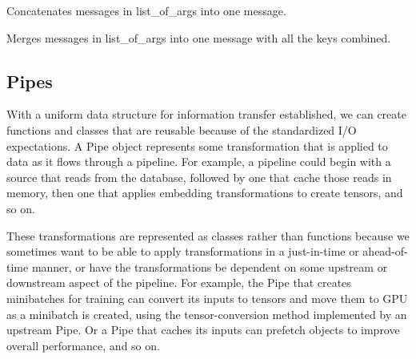 \documentclass[letterpaper,10pt,english]{sphinxmanual}
\begin{document}
\begin{fulllineitems}
\label{\detokenize{Fireworks:Fireworks.core.message.cat}}
Concatenates messages in list\_of\_args into one message.

\end{fulllineitems}


\begin{fulllineitems}
\label{\detokenize{Fireworks:Fireworks.core.message.merge}}
Merges messages in list\_of\_args into one message with all the keys combined.

\end{fulllineitems}



\subsection{Pipes}
\label{\detokenize{Fireworks:pipes}}
With a uniform data structure for information transfer established, we can create functions and classes that are reusable because of the standardized I/O expectations. A Pipe object represents some transformation that is applied to data as it flows through a pipeline. For example, a pipeline could begin with a source that reads from the database, followed by one that cache those reads in memory, then one that applies embedding transformations to create tensors, and so on.

These transformations are represented as classes rather than functions because we sometimes want to be able to apply transformations in a just-in-time or ahead-of-time manner, or have the transformations be dependent on some upstream or downstream aspect of the pipeline. For example, the Pipe that creates minibatches for training can convert its inputs to tensors and move them to GPU as a minibatch is created, using the tensor-conversion method implemented by an upstream Pipe. Or a Pipe that caches its inputs can prefetch objects to improve overall performance, and so on.

\label{\detokenize{Fireworks:module-Fireworks.core.pipe}}
\end{document}
